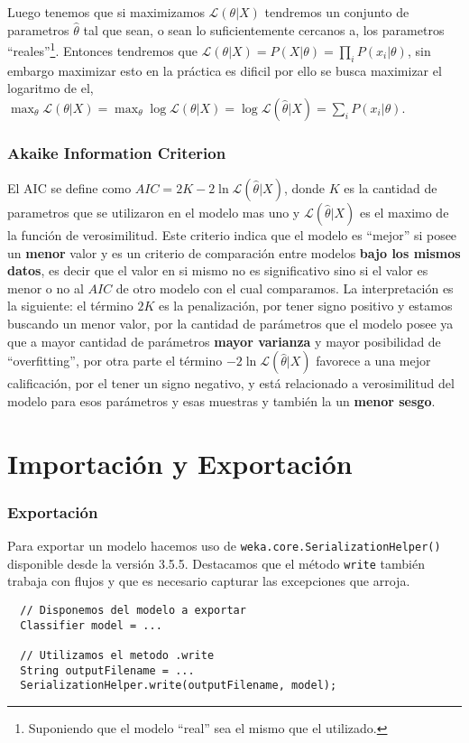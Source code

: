 \documentclass[10pt,a4paper]{article}
\begin{document}
Luego tenemos que si maximizamos $\mathcal{L}(\theta|X)$ tendremos un conjunto de parametros $\hat{\theta}$ tal que sean, o sean lo suficientemente cercanos a, los parametros ``reales''\footnote{Suponiendo que el modelo ``real'' sea el mismo que el utilizado.}. Entonces tendremos que $\mathcal{L}(\theta|X) = P(X|\theta) = \prod_i P(x_i|\theta)$, sin embargo maximizar esto en la práctica es dificil por ello se busca maximizar el logaritmo de el, $\max_\theta \mathcal{L}(\theta|X) = \max_\theta \log \mathcal{L}(\theta|X) = \log \mathcal{L}(\hat{\theta}|X)= \sum_i P(x_i|\theta)$.

\section{Akaike Information Criterion}\label{modelselection_aic}
El AIC se define como $AIC = 2K - 2\ln{\mathcal{L}(\hat{\theta}|X)}$, donde $K$ es la cantidad de parametros que se utilizaron en el modelo mas uno y $\mathcal{L}(\hat{\theta}|X)$ es el maximo de la función de verosimilitud. Este criterio indica que el modelo es ``mejor'' si posee un \textbf{menor} valor y es un criterio de comparación entre modelos \textbf{bajo los mismos datos}, es decir que el valor en si mismo no es significativo sino si el valor es menor o no al $AIC$ de otro modelo con el cual comparamos. La interpretación es la siguiente: el término $2K$ es la penalización, por tener signo positivo y estamos buscando un menor valor, por la cantidad de parámetros que el modelo posee ya que a mayor cantidad de parámetros \textbf{mayor varianza} y mayor posibilidad de ``overfitting'', por otra parte el término $-2 \ln{\mathcal{L}(\hat{\theta}|X)}$ favorece a una mejor calificación, por el tener un signo negativo, y está relacionado a verosimilitud del modelo para esos parámetros y esas muestras y también la un \textbf{menor sesgo}\cite{Hu07}.


\part{Importación y Exportación}
\section{Exportación}
Para exportar un modelo hacemos uso de \lstinline{weka.core.SerializationHelper()} disponible desde la versión 3.5.5. Destacamos que el método \lstinline{write} también trabaja con flujos y que es necesario capturar las excepciones que arroja.
\begin{lstlisting}
  // Disponemos del modelo a exportar
  Classifier model = ...
  
  // Utilizamos el metodo .write
  String outputFilename = ...
  SerializationHelper.write(outputFilename, model);
\end{lstlisting}
\end{document}
